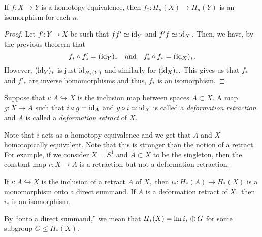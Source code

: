 \documentclass[12pt]{article}
\begin{document}
\begin{prop} \label{prop:homologyishomotinv}
	If $f:X\to Y$ is a homotopy equivalence, then $f_*:H_n(X) \to H_n(Y)$ is an isomorphism for each $n.$
\end{prop}
\begin{proof} 
	Let $f':Y\to X$ be such that $ff'\simeq \operatorname{id}_Y$ and $f'f\simeq\operatorname{id}_X.$ Then, we have, by the previous theorem that
	\begin{equation*} 
		f_* \circ f'_* = (\operatorname{id}_Y)_* \quad\text{and}\quad f'_* \circ f_* = (\operatorname{id}_X)_*.
	\end{equation*}
	However, $(\operatorname{id}_Y)_*$ is just $\operatorname{id}_{H_*(Y)}$ and similarly for $(\operatorname{id}_X)_*.$ This gives us that $f_*$ and $f'_*$ are inverse homomorphisms and thus, $f_*$ is an isomorphism.
\end{proof}

\begin{defn}
	Suppose that $i:A \hookrightarrow X$ is the inclusion map between spaces $A \subset X.$ A map $g:X \to A$ such that $i\circ g = \operatorname{id}_A$ and $g\circ i\simeq\operatorname{id}_X$ is called a \emph{deformation retraction} and $A$ is called a \emph{deformation retract} of $X.$
\end{defn}

Note that $i$ acts as a homotopy equivalence and we get that $A$ and $X$ homotopically equivalent. Note that this is stronger than the notion of a retract. For example, if we consider $X = S^1$ and $A \subset X$ to be the singleton, then the constant map $r:X \to A$ is a retraction but not a deformation retraction.

\begin{cor} \label{cor:defretractisomorphism}
	If $i:A \hookrightarrow X$ is the inclusion of a retract $A$ of $X,$ then $i_* : H_*(A) \to H_*(X)$ is a monomorphism onto a direct summand. If $A$ is a deformation retract of $X,$ then $i_*$ is an isomorphism.
\end{cor}

By ``onto a direct summand,'' we mean that $H_*(X) = \operatorname{im} i_* \oplus G$ for some subgroup $G \le H_*(X).$
\end{document}
